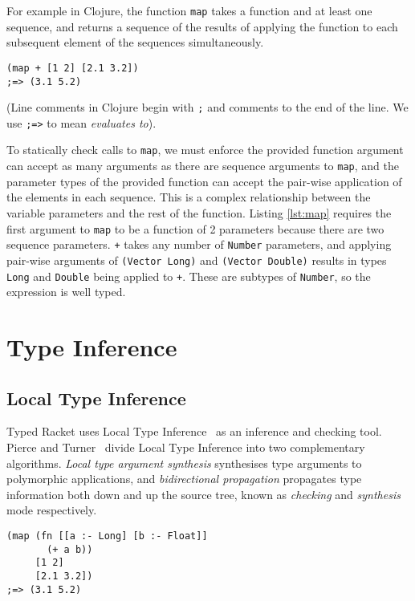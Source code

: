 For example in Clojure, the function \lstinline|map| takes a function and at least one sequence,
and returns a sequence of the results of applying the function to each subsequent element of the sequences simultaneously.

\begin{lstlisting}[caption=An application of the non-uniform variable-arity function \lstinline|map|, label=lst:map]
(map + [1 2] [2.1 3.2]) 
;=> (3.1 5.2)
\end{lstlisting}

(Line comments in Clojure begin with \lstinline|;| and comments to the end of the line. We use \lstinline|;=>| to mean \emph{evaluates to}).

To statically check calls to \lstinline|map|, we must enforce the provided function argument can accept as many
arguments as there are sequence arguments to \lstinline|map|, and the parameter types of the provided function can accept
the pair-wise application of the elements in each sequence. This is a complex relationship between the variable parameters and
the rest of the function.
Listing \ref{lst:map} requires the first argument to \lstinline|map| to be a function of 2 parameters because
there are two sequence parameters. \lstinline|+| takes any number of \lstinline|Number| parameters, 
and applying pair-wise arguments of \lstinline|(Vector Long)| and \lstinline|(Vector Double)| 
results in types \lstinline|Long| and \lstinline|Double| being applied to \lstinline|+|. These are subtypes
of \lstinline|Number|, so the expression is well typed.

\section{Type Inference}

\subsection{Local Type Inference}

Typed Racket uses Local Type Inference~\cite{PT00}
as an inference and checking tool. Pierce and Turner~\cite{PT00}
divide Local Type Inference into
two complementary algorithms. \emph{Local type argument synthesis}
synthesises type arguments to polymorphic applications, and \emph{bidirectional
propagation} propagates type information both down and up the source tree,
known as \emph{checking} and \emph{synthesis} mode respectively.

\begin{lstlisting}[caption=Bidirectional checking algorithm with Typed Clojure pseudocode, label=lst:bidir]
(map (fn [[a :- Long] [b :- Float]]
       (+ a b))
     [1 2]
     [2.1 3.2])
;=> (3.1 5.2)
\end{lstlisting}

